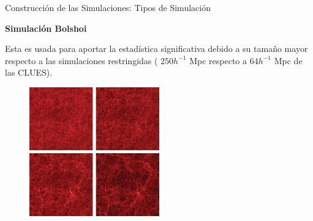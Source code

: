 \documentclass[8pt,fleqn]{beamer}
\begin{document}
\begin{frame}
\begin{block}{Construcción de las Simulaciones: Tipos de Simulación}\justifying

\textbf{Simulación Bolshoi}

Esta es usada para aportar la estadística significativa debido a su tamaño
mayor respecto a las simulaciones restringidas ( $250 h^{-1}$ Mpc respecto a
$64 h^{-1}$ Mpc de las CLUES).

\begin{figure}[htbp]
	\centering
	\includegraphics[trim = 0mm 0mm 0mm 0mm, clip, width=0.5\textwidth]
	{./figures/Bolshoi_Evolution.png}
\end{figure}

\end{block}
\end{frame}
\end{document}
